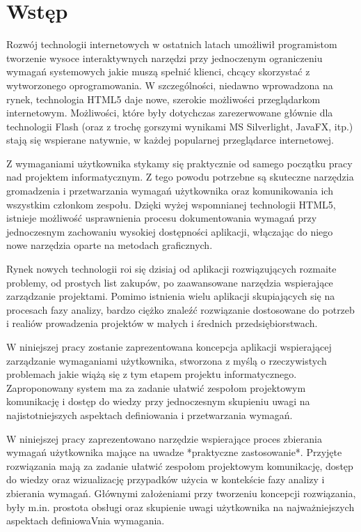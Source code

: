 \chapter{Wstęp}

    Rozwój technologii internetowych w ostatnich latach umożliwił programistom tworzenie wysoce interaktywnych narzędzi przy jednoczenym ograniczeniu wymagań systemowych jakie muszą spełnić klienci, chcący skorzystać z wytworzonego oprogramowania. W szczególności, niedawno wprowadzona na rynek, technologia HTML5 daje nowe, szerokie możliwości przeglądarkom internetowym. Możliwości, które były dotychczas zarezerwowane głównie dla technologii Flash (oraz z trochę gorszymi wynikami MS Silverlight, JavaFX, itp.) stają się wspierane natywnie, w każdej popularnej przeglądarce internetowej. 

    Z wymaganiami użytkownika stykamy się praktycznie od samego początku pracy nad projektem informatycznym. Z tego powodu potrzebne są skuteczne narzędzia gromadzenia i przetwarzania wymagań użytkownika oraz komunikowania ich wszystkim członkom zespołu. Dzięki wyżej wspomnianej technologii HTML5, istnieje możliwość usprawnienia procesu dokumentowania wymagań przy jednoczesnym zachowaniu wysokiej dostępności aplikacji, włączając do niego nowe narzędzia oparte na metodach graficznych. 

    Rynek nowych technologii roi się dzisiaj od aplikacji rozwiązujących rozmaite problemy, od prostych list zakupów, po zaawansowane narzędzia wspierające zarządzanie projektami. Pomimo istnienia wielu aplikacji skupiających się na procesach fazy analizy, bardzo ciężko znaleźć rozwiązanie dostosowane do potrzeb i realiów prowadzenia projektów w małych i średnich przedsiębiorstwach. 
          
    W niniejszej pracy zostanie zaprezentowana koncepcja aplikacji wspierającej zarządzanie wymaganiami użytkownika, stworzona z myślą o rzeczywistych problemach jakie wiążą się z tym etapem projektu informatycznego. Zaproponowany system ma za zadanie ułatwić zespołom projektowym komunikację i dostęp do wiedzy przy jednoczesnym skupieniu uwagi na najistotniejszych aspektach definiowania i przetwarzania wymagań. ~\cite{Leite87}

    W niniejszej pracy zaprezentowano narzędzie wspierające proces zbierania wymagań użytkownika mające na uwadze *praktyczne zastosowanie*. Przyjęte rozwiązania mają za zadanie ułatwić zespołom projektowym komunikację, dostęp do wiedzy oraz wizualizację przypadków użycia w kontekście fazy analizy i zbierania wymagań. Głównymi założeniami przy tworzeniu koncepcji rozwiązania, były m.in. prostota obsługi oraz skupienie uwagi użytkownika na najważniejszych aspektach definiowaVnia wymagania. 


